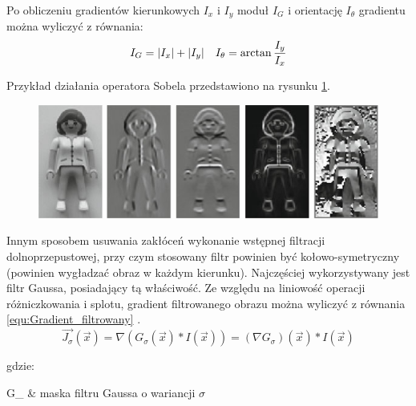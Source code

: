 Po obliczeniu gradientów kierunkowych $I_x$ i $I_y$ moduł $I_G$ i orientację $I_\theta$ gradientu można wyliczyć z równania:
\begin{equation}
\label{equ:Modul_orientacja_gradientu}
	I_G = \lvert I_x\rvert + \lvert I_y\rvert
	\, \, \, \, \, \,
	I_\theta = \arctan \frac{I_y}{I_x}
\end{equation}

Przykład działania operatora Sobela przedstawiono na rysunku \ref{fig:Sobel_przyklad}.

\begin{figure}[!htb]
	\begin{center}
		\includegraphics[width=12cm]{images/sobel_kernel_example.png}
	\end{center}	
\label{fig:Sobel_przyklad}
\end{figure}

Innym sposobem usuwania zakłóceń wykonanie wstępnej filtracji dolnoprzepustowej, przy czym stosowany filtr powinien być kołowo-symetryczny \cite{Szeliski2011} (powinien wygładzać obraz w każdym kierunku). Najczęściej wykorzystywany jest filtr Gaussa, posiadający tą właściwość. Ze względu na liniowość operacji różniczkowania i splotu, gradient filtrowanego obrazu można wyliczyć z równania \ref{equ:Gradient_filtrowany} \cite{Szeliski2011}.
\begin{equation}
\label{equ:Gradient_filtrowany}
	\vec{J_{\sigma}}(\vec{x}) =  \nabla (G_{\sigma}(\vec{x}) \ast I (\vec{x})) = (\nabla G_{\sigma})(\vec{x}) \ast I(\vec{x})
\end{equation}

\noindent
gdzie:

\begin{conditions}
	G_{\sigma} & maska filtru Gaussa o wariancji $\sigma$ \\
\end{conditions}

